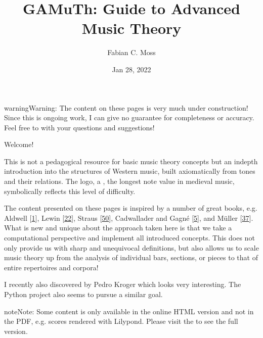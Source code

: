 \documentclass[letterpaper,10pt,english]{sphinxmanual}
\title{GAMuTh: Guide to Advanced Music Theory}
\date{Jan 28, 2022}
\author{Fabian C.\@{} Moss}
\begin{document}
\pagestyle{empty}
\sphinxmaketitle
\pagestyle{plain}
\sphinxtableofcontents
\pagestyle{normal}
\label{\detokenize{index::doc}}


\begin{sphinxadmonition}{warning}{Warning:}
\sphinxAtStartPar
The content on these pages is very much under construction!
Since this is ongoing work, I can give no guarantee for completeness or accuracy.
Feel free to  with your questions and suggestions!
\end{sphinxadmonition}

\sphinxAtStartPar
Welcome!

\sphinxAtStartPar
This is not a pedagogical resource for basic music theory concepts
but an in\sphinxhyphen{}depth introduction into the structures of Western music,
built axiomatically from tones and their relations.
The logo, a , the longest note value in medieval music,
symbolically reflects this level of difficulty.

\sphinxAtStartPar
The content presented on these pages is inspired by a number of great books, e.g.
Aldwell  {[}\hyperlink{cite.8_bibliography:id7}{1}{]}, Lewin {[}\hyperlink{cite.8_bibliography:id2}{22}{]}, Straus {[}\hyperlink{cite.8_bibliography:id3}{50}{]},
Cadwallader and Gagné {[}\hyperlink{cite.8_bibliography:id12}{5}{]}, and Müller {[}\hyperlink{cite.8_bibliography:id18}{37}{]}.
What is new and unique about the approach taken here is that we take
a computational perspective and implement all introduced concepts.
This does not only provide us with sharp and unequivocal definitions,
but also allows us to scale music theory up from the analysis of individual
bars, sections, or pieces to that of entire repertoires and corpora!

\sphinxAtStartPar
I recently also discovered  by Pedro Kroger
which looks very interesting.
The Python project  also seems to pursue a similar goal.

\begin{sphinxadmonition}{note}{Note:}
\sphinxAtStartPar
Some content is only available in the online HTML version and not in the PDF,
e.g. scores rendered with Lilypond. Please visit the  to see the full version.
\end{sphinxadmonition}
\end{document}
